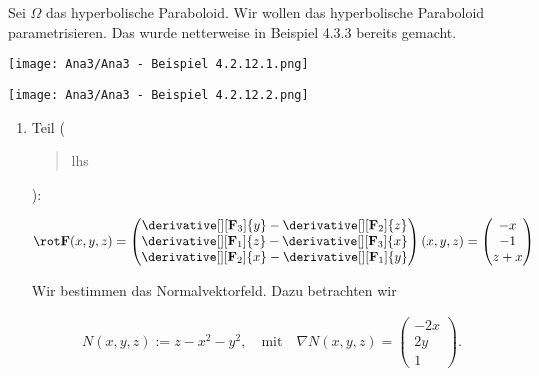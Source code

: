 \begin{solution}

\phantom{}


Sei $\Omega$ das hyperbolische Paraboloid.
Wir wollen das hyperbolische Paraboloid parametrisieren.
Das wurde netterweise in Beispiel 4.3.3 bereits gemacht.

\begin{tcolorbox}[standard jigsaw, opacityback = 0]
    \begin{center}
        \texttt{[image: Ana3/Ana3 - Beispiel 4.2.12.1.png]}        
    \end{center}
    \hspace{1.85cm}
    \texttt{[image: Ana3/Ana3 - Beispiel 4.2.12.2.png]}
\end{tcolorbox}

\begin{enumerate}[label = \arabic*.]

    \item Teil (\blockquote{lhs}):
    
    \begin{align*}
        \rot \mathbf F(x, y, z)
        =
        \begin{pmatrix}
            \derivative[][\mathbf F_3]{y}
            -
            \derivative[][\mathbf F_2]{z} \\
            \derivative[][\mathbf F_1]{z}
            -
            \derivative[][\mathbf F_3]{x} \\
            \derivative[][\mathbf F_2]{x}
            -
            \derivative[][\mathbf F_1]{y}
        \end{pmatrix}
        (x, y, z)
        =
        \begin{pmatrix}
            -x \\ -1 \\ z + x
        \end{pmatrix}
    \end{align*}

    Wir bestimmen das Normalvektorfeld.
    Dazu betrachten wir
    
    \begin{align*}
        N(x, y, z) := z - x^2 - y^2,
        \quad
        \text{mit}
        \quad
        \nabla N(x, y, z)
        =
        \begin{pmatrix}
            -2 x \\ 2 y \\ 1
        \end{pmatrix}.
    \end{align*}
    

\end{enumerate}
\end{solution}
